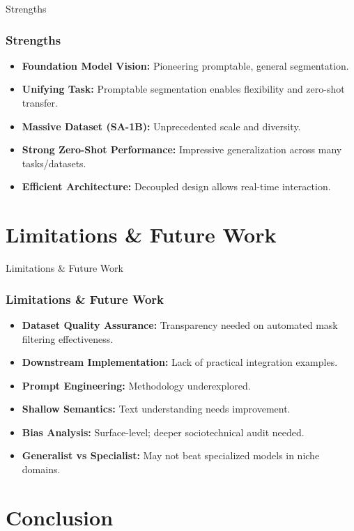 \documentclass{beamer}
\begin{document}
\begin{frame}{Strengths}
    \frametitle{Strengths}
    \begin{itemize}
        \item \textbf{Foundation Model Vision:} Pioneering promptable, general segmentation.
        \item \textbf{Unifying Task:} Promptable segmentation enables flexibility and zero-shot transfer.
        \item \textbf{Massive Dataset (SA-1B):} Unprecedented scale and diversity.
        \item \textbf{Strong Zero-Shot Performance:} Impressive generalization across many tasks/datasets.
        \item \textbf{Efficient Architecture:} Decoupled design allows real-time interaction.
    \end{itemize}
\end{frame}

\section{Limitations & Future Work}

\begin{frame}{Limitations & Future Work}
    \frametitle{Limitations \& Future Work}
    \begin{itemize}
        \item \textbf{Dataset Quality Assurance:} Transparency needed on automated mask filtering effectiveness.
        \item \textbf{Downstream Implementation:} Lack of practical integration examples.
        \item \textbf{Prompt Engineering:} Methodology underexplored.
        \item \textbf{Shallow Semantics:} Text understanding needs improvement.
        \item \textbf{Bias Analysis:} Surface-level; deeper sociotechnical audit needed.
        \item \textbf{Generalist vs Specialist:} May not beat specialized models in niche domains.
    \end{itemize}
\end{frame}

\section{Conclusion}
\end{document}
